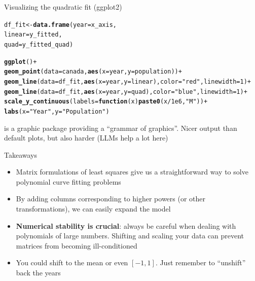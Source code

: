 \documentclass[aspectratio=169]{beamer}\usepackage[]{graphicx}\usepackage[]{xcolor}
\makeatletter
\newcommand{\hlnum}[1]{\textcolor[rgb]{0.686,0.059,0.569}{#1}}%
\newcommand{\hlsng}[1]{\textcolor[rgb]{0.192,0.494,0.8}{#1}}%
\newcommand{\hlopt}[1]{\textcolor[rgb]{0,0,0}{#1}}%
\newcommand{\hldef}[1]{\textcolor[rgb]{0.345,0.345,0.345}{#1}}%
\newcommand{\hlkwa}[1]{\textcolor[rgb]{0.161,0.373,0.58}{\textbf{#1}}}%
\newcommand{\hlkwb}[1]{\textcolor[rgb]{0.69,0.353,0.396}{#1}}%
\newcommand{\hlkwc}[1]{\textcolor[rgb]{0.333,0.667,0.333}{#1}}%
\newcommand{\hlkwd}[1]{\textcolor[rgb]{0.737,0.353,0.396}{\textbf{#1}}}%
\newenvironment{kframe}{%
 \def\at@end@of@kframe{}%
 \ifinner\ifhmode%
  \def\at@end@of@kframe{\end{minipage}}%
  \begin{minipage}{\columnwidth}%
 \fi\fi%
 \def\FrameCommand##1{\hskip\@totalleftmargin \hskip-\fboxsep
 \colorbox{shadecolor}{##1}\hskip-\fboxsep
     \hskip-\linewidth \hskip-\@totalleftmargin \hskip\columnwidth}%
 \MakeFramed {\advance\hsize-\width
   \@totalleftmargin\z@ \linewidth\hsize
   \@setminipage}}%
 {\par\unskip\endMakeFramed%
 \at@end@of@kframe}
\newenvironment{knitrout}{}{} %
\makeatother
\begin{document}
\begin{frame}[fragile]{Visualizing the quadratic fit (ggplot2)}
\begin{knitrout}
\color{fgcolor}\begin{kframe}
\begin{alltt}
\hldef{df_fit} \hlkwb{<-} \hlkwd{data.frame}\hldef{(}\hlkwc{year} \hldef{= x_axis,}
                     \hlkwc{linear} \hldef{= y_fitted,}
                     \hlkwc{quad} \hldef{= y_fitted_quad)}

\hlkwd{ggplot}\hldef{()} \hlopt{+}
  \hlkwd{geom_point}\hldef{(}\hlkwc{data} \hldef{= canada,} \hlkwd{aes}\hldef{(}\hlkwc{x} \hldef{= year,} \hlkwc{y} \hldef{= population))} \hlopt{+}
  \hlkwd{geom_line}\hldef{(}\hlkwc{data} \hldef{= df_fit,} \hlkwd{aes}\hldef{(}\hlkwc{x} \hldef{= year,} \hlkwc{y} \hldef{= linear),} \hlkwc{color} \hldef{=} \hlsng{"red"}\hldef{,} \hlkwc{linewidth} \hldef{=} \hlnum{1}\hldef{)} \hlopt{+}
  \hlkwd{geom_line}\hldef{(}\hlkwc{data} \hldef{= df_fit,} \hlkwd{aes}\hldef{(}\hlkwc{x} \hldef{= year,} \hlkwc{y} \hldef{= quad),} \hlkwc{color} \hldef{=} \hlsng{"blue"}\hldef{,} \hlkwc{linewidth} \hldef{=} \hlnum{1}\hldef{)} \hlopt{+}
  \hlkwd{scale_y_continuous}\hldef{(}\hlkwc{labels} \hldef{=} \hlkwa{function}\hldef{(}\hlkwc{x}\hldef{)} \hlkwd{paste0}\hldef{(x} \hlopt{/} \hlnum{1e6}\hldef{,} \hlsng{"M"}\hldef{))} \hlopt{+}
  \hlkwd{labs}\hldef{(}\hlkwc{x} \hldef{=} \hlsng{"Year"}\hldef{,} \hlkwc{y} \hldef{=} \hlsng{"Population"}\hldef{)}
\end{alltt}
\end{kframe}
\end{knitrout}
\vfill
{} is a graphic package providing a ``grammar of graphics''. Nicer output than default  plots, but also harder (LLMs help a lot here)
\end{frame}


\begin{frame}{Takeaways}
\begin{itemize}
\item Matrix formulations of least squares give us a straightforward way to solve polynomial curve fitting problems
\vfill
\item By adding columns corresponding to higher powers (or other transformations), we can easily expand the model
\vfill
\item \textbf{Numerical stability is crucial}: always be careful when dealing with polynomials of large numbers. Shifting and scaling your data can prevent matrices from becoming ill-conditioned
\vfill
\item You could shift to the mean or even $[-1,1]$. Just remember to ``unshift'' back the years 
\end{itemize}
\end{frame}





\end{document}
